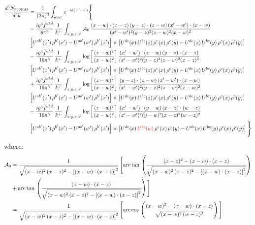\documentclass[9pt]{article}
\newcommand{\chg}[1]{{\color{red}#1}}
\numberwithin{equation}{section}
\begin{document}
\begin{align}
\frac{d^{3}N_{3b\,\rm NLO}}{d^{3}k} & = \frac{1}{(2\pi)^{3}}\int_{w,w'}e^{-ik(w'-w)}\Bigg\{\notag \\
&-\frac{ig^{4}f^{abd}}{8\pi^{5}}\,\frac{1}{k^{+}}\,\int_{x,y,z,x'}\mathcal{A}_{0}\,
\frac{(x-w)\cdot(x-z)\,(y-z)\cdot(z-w)\,(x'-w')\cdot(x-w)}{(x'-w')^{2}(y-z)^{2}(z-w)^{2}(x-w)^{2}}\notag \\ & \left[U^{ab'}(x')\,\rho^{b'}(x')-U^{ab'}(w')\, \rho^{b'}(x')\right]\times \left[U^{de}(x)\,U^{bc}(z)\, \rho^{e}(x)\,\rho^{c}(y)-U^{de}(x)\,U^{bc}(y)\,\rho^{e}(x)\,\rho^{c}(y)\right] \notag \\
& -\frac{ig^{4}f^{abd}}{16\pi^{5}}\,\frac{1}{k^{+}}\,\int_{x,y,z,x'}\log{\left[\frac{(z-w)^{2}}{(x-w)^{2}}\right]}\,
\frac{(x'-w')\cdot(z-w)\,(y-z)\cdot(x-z)}{(x'-w')^{2}(y-z)^{2}(z-w)^{2}(x-z)^{2}}\notag \\
&\left[U^{ab'}(x')\,\rho^{b'}(x')-U^{ab'}(w')\, \rho^{b'}(x')\right]\times \left[U^{de}(x)\,U^{bc}(z)\, \rho^{e}(x)\,\rho^{c}(y)-U^{de}(x)\,U^{bc}(y)\,\rho^{e}(x)\,\rho^{c}(y)\right] \notag \\
&+ \frac{ig^{4}f^{abd}}{16\pi^{5}}\,\frac{1}{k^{+}}\,\int_{x,y,z,x'}\log{\left[\frac{(z-w)^{2}}{(x-w)^{2}}\right]}\,
\frac{(y-z)\cdot(z-w)\,(x'-w')\cdot(x-w)}{(x'-w')^{2}(y-z)^{2}(z-w)^{2}(x-w)^{2}}\notag \\ 
& \left[U^{ab'}(x')\,\rho^{b'}(x')-U^{ab'}(w')\, \rho^{b'}(x')\right]\times \left[U^{de}(x)\,U^{bc}(z)\, \rho^{e}(x)\,\rho^{c}(y)-U^{de}(x)\,U^{bc}(y)\,\rho^{e}(x)\,\rho^{c}(y)\right]\notag \\ & -\frac{ig^{4}f^{abd}}{16\pi^{5}}\,\frac{1}{k^{+}}\,\int_{x,y,z,x'}\log{\left[\frac{(z-w)^{2}}{(x-w)^{2}}\right]}\,\frac{(x'-w')\cdot(y-w)\, (x-z)\cdot (w-z)}{(x'-w')^{2}(y-w)^{2}(x-z)^{2}(w-z)^{2}}\notag \\ & \left[U^{ab'}(x')\,\rho^{b'}(x')-U^{ab'}(w')\, \rho^{b'}(x')\right]\times \left[U^{de}(x)\,\chg{U^{bc}(w)}\, \rho^{e}(x)\,\rho^{c}(y)-U^{de}(x)\,U^{bc}(y)\,\rho^{e}(x)\,\rho^{c}(y)\right]\Bigg\}
\end{align}
where: \begin{align}
\mathcal{A}_{0} & = \frac{1}{\sqrt{(x-w)^{2}\,(x-z)^{2}-\left[(x-w)\cdot (x-z)\right]^{2}}}\, \Bigg[\mathrm{arc\,tan}\,\left(\frac{(x-z)^{2}-(x-w)\cdot (x-z)}{\sqrt{(x-w)^{2}\,(x-z)^{2}-\left[(x-w)\cdot (x-z)\right]^{2}}}\right)\notag \\ & + \mathrm{arc\,tan}\,\left(\frac{(x-w)\cdot (x-z)}{\sqrt{(x-w)^{2}\,(x-z)^{2}-\left[(x-w)\cdot (x-z)\right]^{2}}}\right) \Bigg]\notag \\ & = \frac{1}{\sqrt{(x-w)^{2}\,(x-z)^{2}-\left[(x-w)\cdot (x-z)\right]^{2}}}\, \Bigg[\mathrm{arc\,cos}\,\left(\frac{(x-w)^{2}-(x-w)\cdot (x-z)}{\sqrt{(x-w)^{2}\,(w-z)^{2}}}\right)\Bigg]
\end{align}
\end{document}
